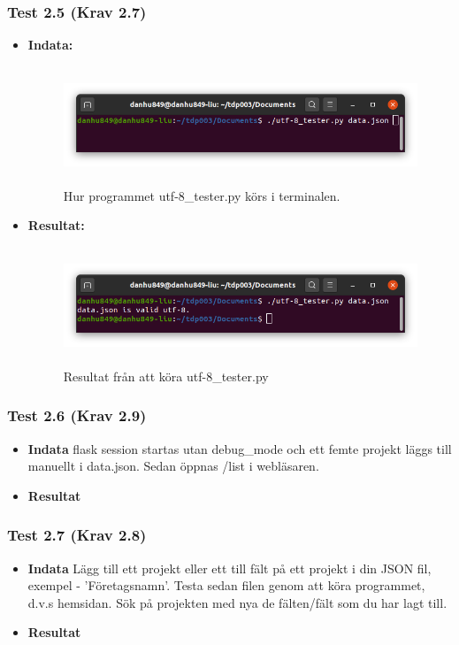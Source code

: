 \documentclass{TDP003mall}
\begin{document}
\subsubsection*{Test 2.5 (Krav 2.7)}
\begin{itemize}
\item[]\textbf{Indata:}
\begin{figure}[h]
\centerline{\includegraphics[width=\textwidth, height=3.5cm]{../Pictures/utf-8_tester_test.png}}
\caption{Hur programmet utf-8\_tester.py körs i terminalen.\label{fig:}}
\end{figure}
\item[]\textbf{Resultat:}
\begin{figure}[h]
\centerline{\includegraphics[width=\textwidth, height=3.5cm]{../Pictures/utf-8_tester_valid.png}}
\caption{Resultat från att köra utf-8\_tester.py\label{fig:}}
\end{figure}
\end{itemize}
\subsubsection*{Test 2.6 (Krav 2.9)}
\begin{itemize}
\item[]\textbf{Indata} flask session startas utan debug\_mode och ett femte projekt läggs till manuellt i data.json. Sedan öppnas /list i webläsaren.
\item[]\textbf{Resultat} 
\end{itemize}
\subsubsection*{Test 2.7 (Krav 2.8)}
\begin{itemize}
\item[]\textbf{Indata} Lägg till ett projekt eller ett till fält på ett projekt i din JSON fil, exempel - 'Företagsnamn'. Testa sedan filen genom att köra programmet, d.v.s hemsidan. Sök på projekten med nya de fälten/fält som du har lagt till.  
\item[]\textbf{Resultat} 
\end{itemize}
\end{document}
